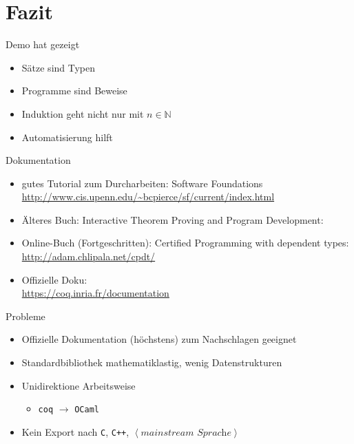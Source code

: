 \documentclass[aspectratio=169]{beamer}
\begin{document}
\section{Fazit}
\begin{frame}
  \begin{center}
    \Large{Demo hat gezeigt}
  \end{center}
  \begin{itemize}
  \item Sätze sind Typen
  \item Programme sind Beweise
  \item Induktion geht nicht nur mit $n\in\mathbb{N}$
  \item Automatisierung hilft
  \end{itemize}
\end{frame}
\begin{frame}
  \begin{center}
    \Large{Dokumentation}
  \end{center}
  \begin{itemize}
  \item gutes Tutorial zum Durcharbeiten: Software Foundations\\
    \qquad \url{http://www.cis.upenn.edu/~bcpierce/sf/current/index.html}
  \item Älteres Buch: Interactive Theorem Proving and Program Development:\\
  \item Online-Buch (Fortgeschritten): Certified Programming with dependent types:\\
    \qquad \url{http://adam.chlipala.net/cpdt/}
  \item Offizielle Doku:\\
    \qquad \url{https://coq.inria.fr/documentation}
  \end{itemize}
\end{frame}
\begin{frame}
  \begin{center}
    \Large{Probleme}
  \end{center}
  \begin{itemize}
  \item Offizielle Dokumentation (höchstens) zum Nachschlagen geeignet
  \item Standardbibliothek mathematiklastig, wenig Datenstrukturen
  \item Unidirektione Arbeitsweise 
    \begin{itemize}
    \item \texttt{coq} $\longrightarrow$ \texttt{OCaml}
    \end{itemize}
  \item Kein Export nach \texttt{C}, \texttt{C++}, $\left<\textit{mainstream Sprache}\right>$
  \end{itemize}

\end{frame} %
\end{document}
